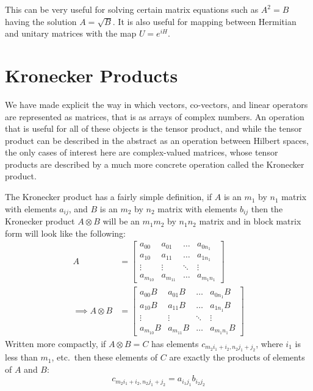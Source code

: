 This can be very useful for solving certain matrix equations such as $A^2 = B$ having the solution $A = \sqrt{B}$. It is also useful for mapping between Hermitian and unitary matrices with the map $U = e^{iH}$.

\section{Kronecker Products}
We have made explicit the way in which vectors, co-vectors, and linear operators are represented as matrices, that is as arrays of complex numbers. An operation that is useful for all of these objects is the tensor product, and while the tensor product can be described in the abstract as an operation between Hilbert spaces, the only cases of interest here are complex-valued matrices, whose tensor products are described by a much more concrete operation called the Kronecker product.

The Kronecker product has a fairly simple definition, if $A$ is an $m_1$ by $n_1$ matrix with elements $a_{ij}$, and $B$ is an $m_2$ by $n_2$ matrix with elements $b_{ij}$ then the Kronecker product $A \otimes B$ will be an $m_1m_2$ by $n_1n_2$ matrix and in block matrix form will look like the following:
\begin{align*}
A &= \left[\begin{matrix}
a_{00} & a_{01} & \dots & a_{0n_1}\\
a_{10} & a_{11} & \dots & a_{1n_1}\\
\vdots & \vdots & \ddots & \vdots\\
a_{m_10} & a_{m_11} & \dots & a_{m_1n_1}
\end{matrix}\right]
\\\implies A\otimes B &= \left[\begin{matrix}
a_{00}B & a_{01}B & \dots & a_{0n_1}B\\
a_{10}B & a_{11}B & \dots & a_{1n_1}B\\
\vdots & \vdots & \ddots & \vdots\\
a_{m_10}B & a_{m_11}B & \dots & a_{m_1n_1}B
\end{matrix}\right]
\end{align*}
Written more compactly, if $A\otimes B = C$ has elements $c_{m_2i_1 + i_2,n_2j_1+j_2}$, where $i_1$ is less than $m_1$, etc.\ then these elements of $C$ are exactly the products of elements of $A$ and $B$:
\[c_{m_2i_1 + i_2,n_2j_1+j_2} = a_{i_1j_1}b_{i_2j_2}\]

